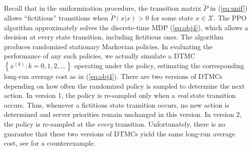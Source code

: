 \documentclass[11pt]{article}
\newcommand{\X}{\mathcal{X}}
\theoremstyle{definition}
\numberwithin{equation}{section}
\begin{document}
Recall that in the uniformization procedure, the transition matrix
$\tilde P$ in (\ref{eq:unif}) allows ``fictitious'' transitions when
$\tilde P(x|x)>0$ for some state $x\in \X$.  The PPO algorithm
approximately solves the discrete-time MDP (\ref{eq:obj4}), which
allows a decision at every state transition, including fictitious ones.
The algorithm produces randomized stationary Markovian
policies.  In evaluating the performance of any such policies, we
actually simulate a DTMC $\left\{x^{(k)}:k=0,1, 2, \ldots\right\}$ operating under
the policy, estimating the corresponding long-run average cost as in
(\ref{eq:obj4}).  There are two versions of DTMCs depending on how
often the randomized policy is sampled to determine the next
action. In version 1, the policy is re-sampled only when a \emph{real}
state transition occurs. Thus, whenever a fictitious state transition
occurs, no new action is determined and server priorities remain
unchanged in this version.
In version 2, the policy is re-sampled at the \emph{every}
transition. Unfortunately, there is no guarantee that these two
versions of DTMCs yield the same long-run average cost, see
\cite[Example 2.2]{Beutler1987} for a counterexample.
\end{document}
